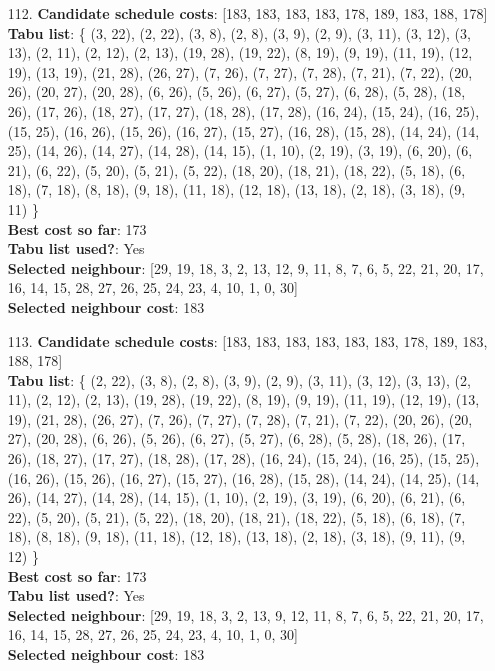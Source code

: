 \documentclass[fleqn]{article}
\begin{document}
\begin{itemize}
    \item[112.] \textbf{Candidate schedule costs}: [183, 183, 183, 183, 178, 189, 183, 188, 178] \\
    \textbf{Tabu list}: \{ (3, 22), (2, 22), (3, 8), (2, 8), (3, 9), (2, 9), (3, 11), (3, 12), (3, 13), (2, 11), (2, 12), (2, 13), (19, 28), (19, 22), (8, 19), (9, 19), (11, 19), (12, 19), (13, 19), (21, 28), (26, 27), (7, 26), (7, 27), (7, 28), (7, 21), (7, 22), (20, 26), (20, 27), (20, 28), (6, 26), (5, 26), (6, 27), (5, 27), (6, 28), (5, 28), (18, 26), (17, 26), (18, 27), (17, 27), (18, 28), (17, 28), (16, 24), (15, 24), (16, 25), (15, 25), (16, 26), (15, 26), (16, 27), (15, 27), (16, 28), (15, 28), (14, 24), (14, 25), (14, 26), (14, 27), (14, 28), (14, 15), (1, 10), (2, 19), (3, 19), (6, 20), (6, 21), (6, 22), (5, 20), (5, 21), (5, 22), (18, 20), (18, 21), (18, 22), (5, 18), (6, 18), (7, 18), (8, 18), (9, 18), (11, 18), (12, 18), (13, 18), (2, 18), (3, 18), (9, 11) \} \\
    \textbf{Best cost so far}: 173 \\
    \textbf{Tabu list used?}: Yes \\
    \textbf{Selected neighbour}: [29, 19, 18, 3, 2, 13, 12, 9, 11, 8, 7, 6, 5, 22, 21, 20, 17, 16, 14, 15, 28, 27, 26, 25, 24, 23, 4, 10, 1, 0, 30] \\
    \textbf{Selected neighbour cost}: 183
      

    \item[113.] \textbf{Candidate schedule costs}: [183, 183, 183, 183, 183, 183, 178, 189, 183, 188, 178] \\
    \textbf{Tabu list}: \{ (2, 22), (3, 8), (2, 8), (3, 9), (2, 9), (3, 11), (3, 12), (3, 13), (2, 11), (2, 12), (2, 13), (19, 28), (19, 22), (8, 19), (9, 19), (11, 19), (12, 19), (13, 19), (21, 28), (26, 27), (7, 26), (7, 27), (7, 28), (7, 21), (7, 22), (20, 26), (20, 27), (20, 28), (6, 26), (5, 26), (6, 27), (5, 27), (6, 28), (5, 28), (18, 26), (17, 26), (18, 27), (17, 27), (18, 28), (17, 28), (16, 24), (15, 24), (16, 25), (15, 25), (16, 26), (15, 26), (16, 27), (15, 27), (16, 28), (15, 28), (14, 24), (14, 25), (14, 26), (14, 27), (14, 28), (14, 15), (1, 10), (2, 19), (3, 19), (6, 20), (6, 21), (6, 22), (5, 20), (5, 21), (5, 22), (18, 20), (18, 21), (18, 22), (5, 18), (6, 18), (7, 18), (8, 18), (9, 18), (11, 18), (12, 18), (13, 18), (2, 18), (3, 18), (9, 11), (9, 12) \} \\
    \textbf{Best cost so far}: 173 \\
    \textbf{Tabu list used?}: Yes \\
    \textbf{Selected neighbour}: [29, 19, 18, 3, 2, 13, 9, 12, 11, 8, 7, 6, 5, 22, 21, 20, 17, 16, 14, 15, 28, 27, 26, 25, 24, 23, 4, 10, 1, 0, 30] \\
    \textbf{Selected neighbour cost}: 183
      


\end{itemize}
\end{document}
